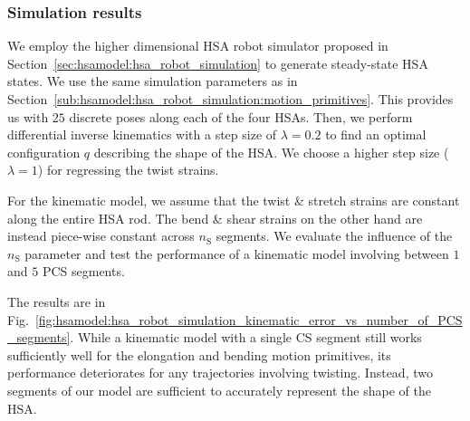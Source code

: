 
\subsubsection{Simulation results}\label{ssub:hsamodel:hsa_rod_kinematics:simulation_results}
%
We employ the higher dimensional \gls{HSA} robot simulator proposed in Section~\ref{sec:hsamodel:hsa_robot_simulation} to generate steady-state \gls{HSA} states. We use the same simulation parameters as in Section~\ref{sub:hsamodel:hsa_robot_simulation:motion_primitives}. This provides us with $25$ discrete poses along each of the four \glspl{HSA}.
Then, we perform differential inverse kinematics with a step size of $\lambda = 0.2$ to find an optimal configuration $q$ describing the shape of the \gls{HSA}. We choose a higher step size ($\lambda=1$) for regressing the twist strains.

For the kinematic model, we assume that the twist \& stretch strains are constant along the entire \gls{HSA} rod. The bend \& shear strains on the other hand are instead piece-wise constant across $n_\mathrm{S}$ segments. We evaluate the influence of the $n_\mathrm{S}$ parameter and test the performance of a kinematic model involving between $1$ and $5$ \gls{PCS} segments.

The results are in Fig.~\ref{fig:hsamodel:hsa_robot_simulation_kinematic_error_vs_number_of_PCS_segments}. While a kinematic model with a single \gls{CS} segment still works sufficiently well for the elongation and bending motion primitives, its performance deteriorates for any trajectories involving twisting. Instead, two segments of our model are sufficient to accurately represent the shape of the \gls{HSA}. 


